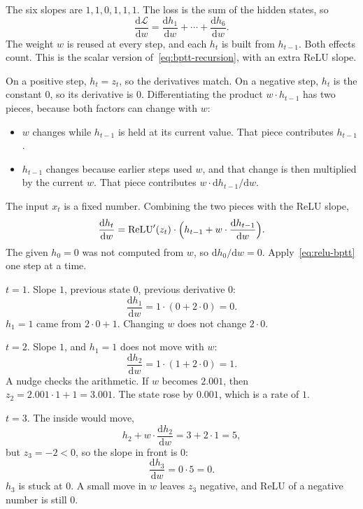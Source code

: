 \documentclass[11pt]{article}
\begin{document}
The six slopes are \(1,1,0,1,1,1\). The loss is the sum of the hidden
states, so
\[
\frac{\mathrm{d}\mathcal{L}}{\mathrm{d}w}
=
\frac{\mathrm{d}h_1}{\mathrm{d}w}+\cdots+\frac{\mathrm{d}h_6}{\mathrm{d}w}.
\]
The weight \(w\) is reused at every step, and each \(h_t\) is built from
\(h_{t-1}\). Both effects count. This is the scalar version
of~\eqref{eq:bptt-recursion}, with an extra ReLU slope.

On a positive step, \(h_t=z_t\), so the derivatives match. On a negative
step, \(h_t\) is the constant \(0\), so its derivative is \(0\).
Differentiating the product \(w\cdot h_{t-1}\) has two pieces, because both
factors can change with \(w\):
\begin{itemize}[leftmargin=*]
  \item \(w\) changes while \(h_{t-1}\) is held at its current value. That
        piece contributes \(h_{t-1}\).
  \item \(h_{t-1}\) changes because earlier steps used \(w\), and that
        change is then multiplied by the current \(w\). That piece
        contributes \(w\cdot\mathrm{d}h_{t-1}/\mathrm{d}w\).
\end{itemize}
The input \(x_t\) is a fixed number. Combining the two pieces with the ReLU
slope,
\begin{equation}
\label{eq:relu-bptt}
\frac{\mathrm{d}h_t}{\mathrm{d}w}
=
\mathrm{ReLU}'(z_t)
\cdot
\Bigl(
h_{t-1}
+
w\cdot\frac{\mathrm{d}h_{t-1}}{\mathrm{d}w}
\Bigr).
\end{equation}
The given \(h_0=0\) was not computed from \(w\), so
\(\mathrm{d}h_0/\mathrm{d}w=0\). Apply~\eqref{eq:relu-bptt} one step at a
time.

\(t=1\). Slope \(1\), previous state \(0\), previous derivative \(0\):
\[
\frac{\mathrm{d}h_1}{\mathrm{d}w}
=
1\cdot(0+2\cdot 0)=0.
\]
\(h_1=1\) came from \(2\cdot 0+1\). Changing \(w\) does not change
\(2\cdot 0\).

\(t=2\). Slope \(1\), and \(h_1=1\) does not move with \(w\):
\[
\frac{\mathrm{d}h_2}{\mathrm{d}w}
=
1\cdot(1+2\cdot 0)=1.
\]
A nudge checks the arithmetic. If \(w\) becomes \(2.001\), then
\(z_2=2.001\cdot 1+1=3.001\). The state rose by \(0.001\), which is a rate
of \(1\).

\(t=3\). The inside would move,
\[
h_2+w\cdot\frac{\mathrm{d}h_2}{\mathrm{d}w}=3+2\cdot 1=5,
\]
but \(z_3=-2<0\), so the slope in front is \(0\):
\[
\frac{\mathrm{d}h_3}{\mathrm{d}w}=0\cdot 5=0.
\]
\(h_3\) is stuck at \(0\). A small move in \(w\) leaves \(z_3\) negative,
and ReLU of a negative number is still \(0\).
\end{document}

